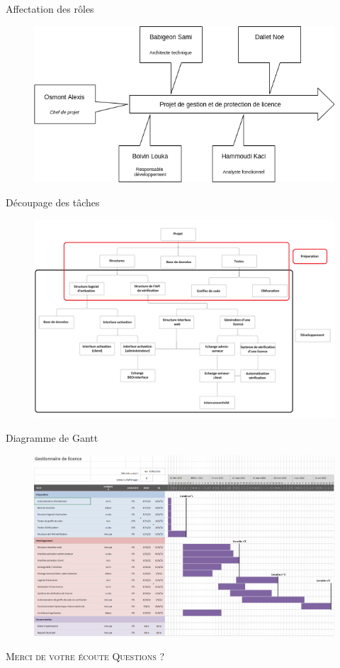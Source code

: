 \documentclass{cubeamer}
\begin{document}
\begin{frame}{Affectation des rôles}
    \begin{figure}
        \centering
        \includegraphics[scale=0.5]{img/schema_role_projet.png}
    \end{figure}
\end{frame}

\begin{frame}{Découpage des tâches}
    \begin{figure}
        \centering
        \includegraphics[scale=0.2]{img/organi.png}
    \end{figure}
\end{frame}

\begin{frame}{Diagramme de Gantt}
    \begin{figure}
        \centering
        \includegraphics[scale=0.2]{img/Gantt.png}
    \end{figure}
\end{frame}

\begin{frame}[standout]
    \Huge\textsc{Merci de votre écoute}
    \vfill
    \LARGE\textsc{Questions ?}
\end{frame}
\end{document}
